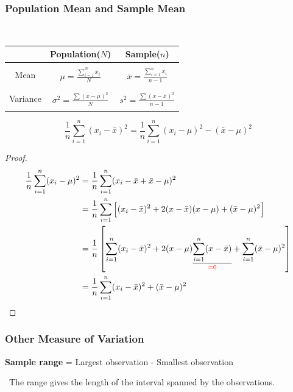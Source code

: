 \documentclass[12pt,a4paper]{article}
\newcommand{\dispsty}{\displaystyle}
\newcommand{\mean}[1]{\bar{#1}}
\begin{document}
\subsubsection{Population Mean and Sample Mean}
\ \begin{center}
	\begin{tabular}{c||c|c}
	\toprule[1.2pt]
	& \textbf{Population}($N$) & \textbf{Sample}($n$) \\
	\hline
	&&\\
	Mean & \(\dispsty\mu = \frac{\sum_{i=1}^Nx_i}{N} \) & \(\dispsty\mean{x} = \frac{\sum_{i=1}^nx_i}{n-1} \)\\&&\\
	\hline&&\\
	Variance & \(\dispsty \sigma^2 = \frac{\sum(x-\mu)^2 }{N} \) & \(\dispsty s^2 = \frac{\sum(x-\mean{x})^2 }{n-1} \)\\&&\\
	\bottomrule[1.2pt]
\end{tabular}
\end{center}\begin{tcolorbox}[colback=white]\[
	\frac{1}{n}\sum_{i=1}^n(x_i-\mean{x})^2=\frac{1}{n}\sum_{i=1}^n(x_i-\mu)^2-(\mean{x}-\mu)^2
	\] \begin{proof}\begin{align*}
		\frac{1}{n}\sum_{i=1}^n(x_i-\mu)^2&=\frac{1}{n}\sum_{i=1}^n(x_i-\mean{x}+\mean{x}-\mu)^2 \\
		&=\frac{1}{n}\sum_{i=1}^n\left[(x_i-\mean{x})^2+2(x-\mean{x})(x-\mu)+(\mean{x}-\mu)^2\right] \\
		&=\frac{1}{n}\left[\sum_{i=1}^n(x_i-\mean{x})^2+2(x-\mu)\underset{\textcolor{red}{=0}}{\underline{\sum_{i=1}^n(x-\mean{x})}}+\sum_{i=1}^n(\mean{x}-\mu)^2 \right] \\
		&= \frac{1}{n}\sum_{i=1}^n(x_i-\mean{x})^2+(\mean{x}-\mu)^2
	\end{align*}
	\end{proof}
\end{tcolorbox}

\subsubsection{Other Measure of Variation}
\begin{tcolorbox}[colback=white]
	\centering
	\textbf{Sample range} = Largest observation - Smallest observation
\end{tcolorbox}\
The range gives the length of the interval spanned by the observations.
\end{document}
